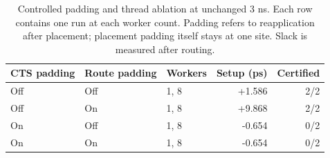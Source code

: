 \begin{table}[htbp]\centering\small\setlength{\tabcolsep}{4pt}
\caption{Controlled padding and thread ablation at unchanged 3 ns. Each row contains one run at each worker count. Padding refers to reapplication after placement; placement padding itself stays at one site. Slack is measured after routing.}\label{tab:paddingthread}
\begin{tabular}{@{}lllrr@{}}\toprule
CTS padding & Route padding & Workers & Setup (ps) & Certified \\
\midrule
Off & Off & 1, 8 & +1.586 & 2/2 \\
Off & On & 1, 8 & +9.868 & 2/2 \\
On & Off & 1, 8 & -0.654 & 0/2 \\
On & On & 1, 8 & -0.654 & 0/2 \\
\bottomrule\end{tabular}\end{table}
